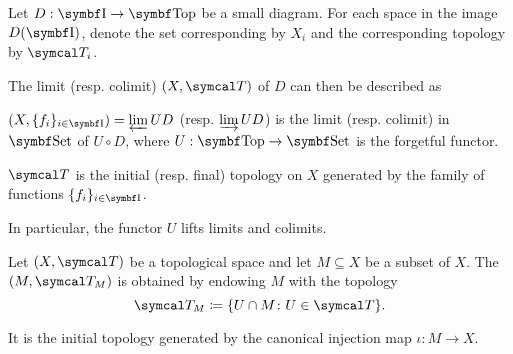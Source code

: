 \begin{proposition}\label{thm:initial_final_topology_limit}\cite{nLab:top}
  Let \( D: \Bold I \to \Bold{Top} \) be a small diagram. For each space in the image \( D(\Bold I) \), denote the set corresponding by \( X_i \) and the corresponding topology by \( \Cal{T}_i \).

  The limit (resp. colimit) \( (X, \Cal{T}) \) of \( D \) can then be described as
  \begin{defenum}
    \item \( (X, \{ f_i \}_{i \in \Bold{I}}) = \varprojlim UD \) (resp. \( \varinjlim UD \)) is the limit (resp. colimit) in \( \Bold{Set} \) of \( U \circ D \), where \( U: \Bold{Top} \to \Bold{Set} \) is the forgetful functor.
    \item \( \Cal{T} \) is the initial (resp. final) topology on \( X \) generated by the family of functions \( \{ f_i \}_{i \in \Bold{I}} \).
  \end{defenum}

  In particular, the functor \( U \) lifts limits and colimits.
\end{proposition}

\begin{definition}\label{def:topological_subspace}
  Let \( (X, \Cal{T}) \) be a topological space and let \( M \subseteq X \) be a subset of \( X \). The  \( (M, \Cal{T}_M) \) is obtained by endowing \( M \) with the topology
  \begin{equation*}
    \Cal{T}_M \coloneqq \{ U \cap M \colon U \in \Cal{T} \}.
  \end{equation*}

  It is the initial topology generated by the canonical injection map \( \iota: M \to X \).
\end{definition}

